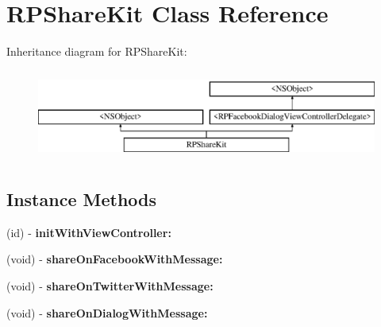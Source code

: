 \hypertarget{interface_r_p_share_kit}{\section{R\-P\-Share\-Kit Class Reference}
\label{interface_r_p_share_kit}
}
Inheritance diagram for R\-P\-Share\-Kit\-:\begin{figure}[H]
\begin{center}
\leavevmode
\includegraphics[height=3.000000cm]{interface_r_p_share_kit}
\end{center}
\end{figure}
\subsection*{Instance Methods}
\begin{DoxyCompactItemize}
\item 
\hypertarget{interface_r_p_share_kit_a05f5b480d6238c575086536810d65dd9}{(id) -\/ {\bfseries init\-With\-View\-Controller\-:}}\label{interface_r_p_share_kit_a05f5b480d6238c575086536810d65dd9}

\item 
\hypertarget{interface_r_p_share_kit_a5463b470f7258b74c6757455b37c26a9}{(void) -\/ {\bfseries share\-On\-Facebook\-With\-Message\-:}}\label{interface_r_p_share_kit_a5463b470f7258b74c6757455b37c26a9}

\item 
\hypertarget{interface_r_p_share_kit_af77f7b8f573c385f01a55a734c309444}{(void) -\/ {\bfseries share\-On\-Twitter\-With\-Message\-:}}\label{interface_r_p_share_kit_af77f7b8f573c385f01a55a734c309444}

\item 
\hypertarget{interface_r_p_share_kit_a5b58fe996787fcb4a2c5bead7e5b65a0}{(void) -\/ {\bfseries share\-On\-Dialog\-With\-Message\-:}}\label{interface_r_p_share_kit_a5b58fe996787fcb4a2c5bead7e5b65a0}

\end{DoxyCompactItemize}
